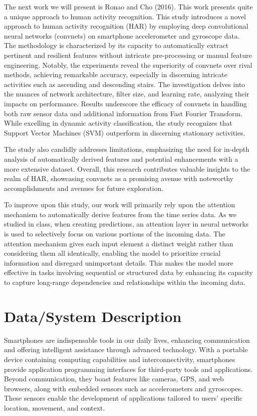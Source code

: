 \documentclass[conference]{IEEEtran}
\begin{document}
The next work we will present is Ronao and Cho (2016). This work presents quite a unique approach to human activity recognition. This study introduces a novel approach to human activity recognition (HAR) by employing deep convolutional neural networks (convnets) on smartphone accelerometer and gyroscope data. The methodology is characterized by its capacity to automatically extract pertinent and resilient features without intricate pre-processing or manual feature engineering. Notably, the experiments reveal the superiority of convnets over rival methods, achieving remarkable accuracy, especially in discerning intricate activities such as ascending and descending stairs. The investigation delves into the nuances of network architecture, filter size, and learning rate, analyzing their impacts on performance. Results underscore the efficacy of convnets in handling both raw sensor data and additional information from Fast Fourier Transform. While excelling in dynamic activity classification, the study recognizes that Support Vector Machines (SVM) outperform in discerning stationary activities. \newline 

The study also candidly addresses limitations, emphasizing the need for in-depth analysis of automatically derived features and potential enhancements with a more extensive dataset. Overall, this research contributes valuable insights to the realm of HAR, showcasing convnets as a promising avenue with noteworthy accomplishments and avenues for future exploration. \newline 

To improve upon this study, our work will primarily rely upon the attention mechanism to automatically derive features from the time series data. As we studied in class, when creating predictions, an attention layer in neural networks is used to selectively focus on various portions of the incoming data. The attention mechanism gives each input element a distinct weight rather than considering them all identically, enabling the model to prioritize crucial information and disregard unimportant details. This makes the model more effective in tasks involving sequential or structured data by enhancing its capacity to capture long-range dependencies and relationships within the incoming data.

\section{Data/System Description}
Smartphones are indispensable tools in our daily lives, enhancing communication and offering intelligent assistance through advanced technology. With a portable device containing computing capabilities and interconnectivity, smartphones provide application programming interfaces for third-party tools and applications. Beyond communication, they boast features like cameras, GPS, and web browsers, along with embedded sensors such as accelerometers and gyroscopes. These sensors enable the development of applications tailored to users' specific location, movement, and context.
\end{document}
